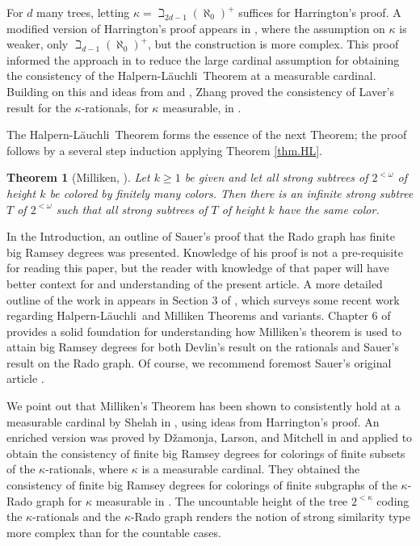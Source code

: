 \documentclass{amsart}
\newtheorem{thm}{Theorem}[section]
\theoremstyle{remark}
\theoremstyle{definition}
\theoremstyle{remark}
\newcommand{\om}{\omega}
\newcommand{\Lauchli}{L{\"{a}}uchli}
\begin{document}
For $d$ many trees,  letting  $\kappa=\beth_{2d-1}(\aleph_0)^+$ suffices for Harrington's proof.
A  modified version of Harrington's proof appears in
\cite{Farah/TodorcevicBK}, where the assumption on $\kappa$ is weaker, only $\beth_{d-1}(\aleph_0)^+$,  but the construction is more complex.
This proof informed the approach in \cite{Dobrinen/Hathaway16}
to reduce the large cardinal assumption for obtaining the consistency of the Halpern-\Lauchli\ Theorem at  a measurable cardinal.
Building on this and  ideas from \cite{Shelah91} and \cite{Dzamonja/Larson/MitchellRado09}, Zhang proved the consistency of Laver's result for the $\kappa$-rationals, for $\kappa$ measurable, in \cite{Zhang17}.




The Halpern-\Lauchli\ Theorem forms the essence of the next Theorem; the proof   follows  by a several step  induction
 applying Theorem \ref{thm.HL}.



\begin{thm}[Milliken, \cite{Milliken79}]\label{thm.Milliken}
Let $k\ge 1$ be given and let  all  strong subtrees of $2^{<\om}$  of height $k$ be colored by finitely many colors.
Then there is an infinite strong subtree $T$ of $2^{<\om}$ such that all strong subtrees of $T$ of height $k$ have the same color.
\end{thm}




In the Introduction,
an outline of Sauer's proof that the Rado graph has finite big Ramsey degrees was presented.
Knowledge of his proof is not a pre-requisite for reading this paper,
but the reader with knowledge of that paper will have better context for and understanding of  the present article.
A more detailed outline of the work in \cite{Sauer06} appears in Section 3 of \cite{DobrinenRIMS17}, which surveys some recent work regarding Halpern-\Lauchli\ and Milliken Theorems and variants.
Chapter 6 of \cite{TodorcevicBK10} provides a solid  foundation  for understanding how  Milliken's theorem is used to attain big Ramsey degrees for both Devlin's result on the rationals and Sauer's result on the Rado graph.
Of course,  we recommend foremost Sauer's original article \cite{Sauer06}.


We point out that
 Milliken's Theorem
 has been shown to consistently hold at a measurable cardinal by Shelah in \cite{Shelah91}, using ideas from Harrington's proof.
An enriched version was proved by D\v{z}amonja, Larson, and Mitchell in  \cite{Dzamonja/Larson/MitchellRado09} and applied  to obtain the consistency of finite big Ramsey degrees for colorings of finite subsets of the $\kappa$-rationals,
 where $\kappa$ is a measurable cardinal.
They
 obtained the consistency of finite big Ramsey degrees for colorings of finite subgraphs of the $\kappa$-Rado graph for $\kappa$ measurable
in \cite{Dzamonja/Larson/MitchellRado09}.
The uncountable height of the tree $2^{<\kappa}$ coding the $\kappa$-rationals and the $\kappa$-Rado graph   renders
 the notion of strong similarity type  more complex than for the countable cases.
\end{document}
